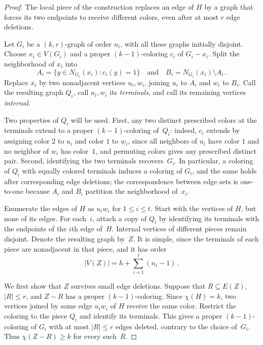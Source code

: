 \documentclass[11pt,letterpaper]{article}
\numberwithin{equation}{section}
\theoremstyle{plain}
\theoremstyle{definition}
\theoremstyle{remark}
\begin{document}
\begin{proof}
The local piece of the construction replaces an edge of $H$ by a graph that forces its two endpoints to receive different colors, even after at most $r$ edge deletions.

Let $G_i$ be a $(k,r)$-graph of order $n_i$, with all these graphs initially disjoint. Choose $x_i\in V(G_i)$ and a proper $(k-1)$-coloring $c_i$ of $G_i-x_i$. Split the neighborhood of $x_i$ into
\begin{equation*}
  A_i=\{y\in N_{G_i}(x_i): c_i(y)=1\}\quad\mbox{and}\quad B_i=N_{G_i}(x_i)\setminus A_i\,.
\end{equation*}
Replace $x_i$ by two nonadjacent vertices $u_i,w_i$, joining $u_i$ to $A_i$ and $w_i$ to $B_i$. Call the resulting graph $Q_i$, call $u_i,w_i$ its \emph{terminals}, and call its remaining vertices \emph{internal}.

Two properties of $Q_i$ will be used. First, any two distinct prescribed colors at the terminals extend to a proper $(k-1)$-coloring of~$Q_i$: indeed, $c_i$ extends by assigning color $2$ to $u_i$ and color $1$ to $w_i$, since all neighbors of $u_i$ have color $1$ and no neighbor of $w_i$ has color~$1$, and permuting colors gives any prescribed distinct pair. Second, identifying the two terminals recovers~$G_i$. In particular, a coloring of $Q_i$ with equally colored terminals induces a coloring of $G_i$, and the same holds after corresponding edge deletions; the correspondence between edge sets is one-to-one because $A_i$ and $B_i$ partition the neighborhood of~$x_i$.

Enumerate the edges of $H$ as $u_iw_i$ for $1\le i\le t$. Start with the vertices of $H$, but none of its edges. For each~$i$, attach a copy of $Q_i$ by identifying its terminals with the endpoints of the $i$th edge of~$H$. Internal vertices of different pieces remain disjoint. Denote the resulting graph by~$Z$. It is simple, since the terminals of each piece are nonadjacent in that piece, and it has order
\begin{equation*}
  |V(Z)|=h+\sum_{i=1}^t (n_i-1)\,.
\end{equation*}

We first show that $Z$ survives small edge deletions. Suppose that $R\subseteq E(Z)$, $|R|\le r$, and $Z-R$ has a proper $(k-1)$-coloring. Since $\chi(H)=k$, two vertices joined by some edge $u_iw_i$ of $H$ receive the same color. Restrict the coloring to the piece $Q_i$ and identify its terminals. This gives a proper $(k-1)$-coloring of $G_i$ with at most $|R|\le r$ edges deleted, contrary to the choice of~$G_i$. Thus $\chi(Z-R)\ge k$ for every such~$R$.


\end{proof}
\end{document}
